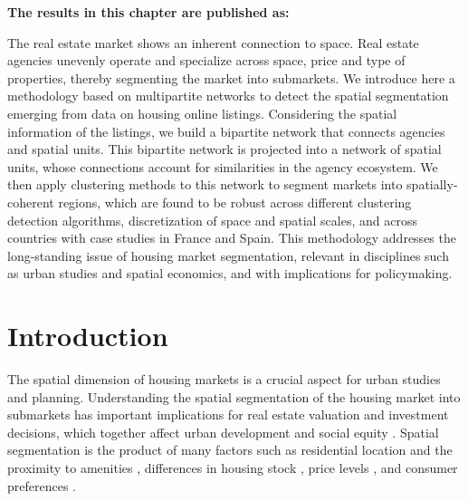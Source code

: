 \vspace{-1.5cm}
\small
\textbf{The results in this chapter are published as:}
\vspace{0.05 cm}

\normalsize
\vspace{0.5 cm}

The real estate market shows an inherent connection to space. Real estate agencies unevenly operate and specialize across space, price and type of properties, thereby segmenting the market into submarkets. We introduce here a methodology based on multipartite networks to detect the spatial segmentation emerging from data on housing online listings. Considering the spatial information of the listings, we build a bipartite network that connects agencies and spatial units. This bipartite network is projected into a network of spatial units, whose connections account for similarities in the agency ecosystem. We then apply clustering methods to this network to segment  markets into spatially-coherent regions, which are found to be robust across different clustering detection algorithms, discretization of space and spatial scales, and across countries with case studies in France and Spain.  This methodology addresses the long-standing issue of housing market segmentation, relevant in disciplines such as urban studies and spatial economics, and with implications for policymaking. 

\section{Introduction}
\label{sec:introduction}

The spatial dimension of housing markets is a crucial aspect for urban studies and planning. Understanding the spatial segmentation of the housing market into submarkets \cite{morawakage2022housing,bourassa2003housing} has important implications for real estate valuation and investment decisions, which together affect urban development and social equity \cite{bourassa2003housing}. Spatial segmentation is the product of many factors such as residential location and the proximity to amenities \cite{bourassa2003housing}, differences in housing stock \cite{keskin2017defining}, price levels \cite{goodman1998housing}, and consumer preferences \cite{leishman2013predictive}. 

